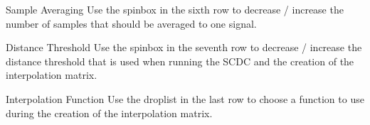 \begin{aims}
	\item[\hspace*{10mm} Sample Averaging] Use the spinbox in the sixth row to decrease / increase the number of samples that should be averaged to one signal.
\end{aims}

\begin{aims}
	\item[\hspace*{10mm} Distance Threshold] Use the spinbox in the seventh row to decrease / increase the distance threshold that is used when running the SCDC and the creation of the interpolation matrix.
\end{aims}

\begin{aims}
	\item[\hspace*{10mm} Interpolation Function] Use the droplist in the last row to choose a function to use during the creation of the interpolation matrix.
\end{aims}